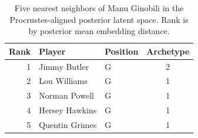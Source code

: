 \begin{table}[htbp]
  \centering\small
  \begin{tabular}{rllc}
    \toprule
    Rank & Player & Position & Archetype \\
    \midrule
    1 & Jimmy Butler & G & 2 \\
    2 & Lou Williams & G & 1 \\
    3 & Norman Powell & G & 1 \\
    4 & Hersey Hawkins & G & 1 \\
    5 & Quentin Grimes & G & 1 \\
    \bottomrule
  \end{tabular}
  \caption{Five nearest neighbors of Manu Ginobili in the Procrustes-aligned posterior latent space. Rank is by posterior mean embedding distance.}
  \label{tab:Manu_Ginobili_neighbors}
\end{table}

